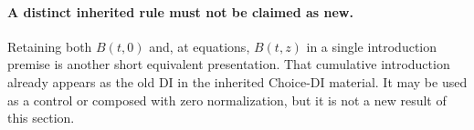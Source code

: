 \paragraph{A distinct inherited rule must not be claimed as new.}
Retaining both $B(t,0)$ and, at equations, $B(t,z)$ in a single
introduction premise is another short equivalent presentation.  That
cumulative introduction already appears as the old DI in the
inherited Choice-DI material.  It may be used as a control or composed
with zero normalization, but it is not a new result of this section.
